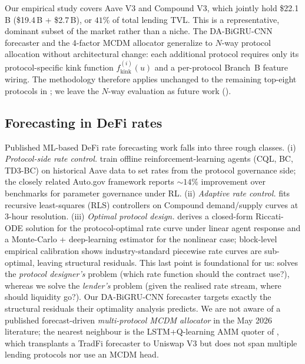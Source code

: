 Our empirical study covers Aave V3 and Compound V3, which jointly hold
\$22.1\,B (\$19.4\,B + \$2.7\,B), or $41\%$ of total lending TVL.  This
is a representative, dominant subset of the market rather than a niche.
The DA-BiGRU-CNN forecaster and the 4-factor MCDM allocator generalize
to $N$-way protocol allocation without architectural change: each
additional protocol requires only its protocol-specific kink function
$f_{\text{kink}}^{(i)}(u)$ and a per-protocol Branch~B feature wiring.
The methodology therefore applies unchanged to the remaining top-eight
protocols in ; we leave the $N$-way evaluation as
future work ().

\subsection{Forecasting in DeFi rates}
\label{sec:bg-forecasting}

Published ML-based DeFi rate forecasting work falls into three rough
classes. (i) \emph{Protocol-side rate control.}
\cite{bertucci2025rl} train offline reinforcement-learning agents (CQL,
BC, TD3-BC) on historical Aave data to set rates from the protocol
governance side; the closely related Auto.gov framework
\cite{xu2023autogov} reports $\sim14\%$ improvement over benchmarks for
parameter governance under RL. (ii) \emph{Adaptive rate control.}
\cite{agilerate2024} fits recursive least-squares (RLS) controllers on
Compound demand/supply curves at 3-hour resolution. (iii) \emph{Optimal
protocol design.} \cite{baude2025optimal} derives a closed-form
Riccati-ODE solution for the protocol-optimal rate curve under linear
agent response and a Monte-Carlo + deep-learning estimator for the
nonlinear case; block-level empirical calibration shows industry-standard
piecewise rate curves are sub-optimal, leaving structural residuals.
This last point is foundational for us: \cite{baude2025optimal} solves
the \emph{protocol designer's} problem (which rate function should the
contract use?), whereas we solve the \emph{lender's} problem (given the
realised rate stream, where should liquidity go?). Our DA-BiGRU-CNN
forecaster targets exactly the structural residuals their optimality
analysis predicts.  We are not aware of a published forecast-driven
\emph{multi-protocol MCDM allocator} in the May 2026 literature; the
nearest neighbour is the LSTM+Q-learning AMM quoter of
\cite{predamm2024}, which transplants a TradFi forecaster to Uniswap V3
but does not span multiple lending protocols nor use an MCDM head.

